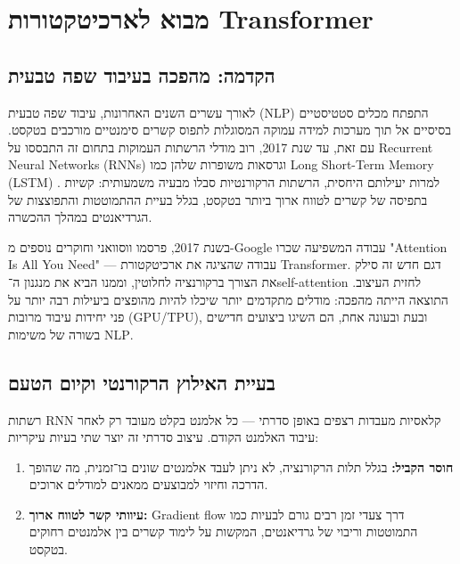 \chapter{מבוא לארכיטקטורות \textenglish{Transformer}}

\section{הקדמה: מהפכה בעיבוד שפה טבעית}

לאורך עשרים השנים האחרונות, עיבוד שפה טבעית (\textenglish{NLP}) התפתח מכלים סטטיסטיים בסיסיים אל תוך מערכות למידה עמוקה המסוגלות לתפוס קשרים סימנטיים מורכבים בטקסט. עם זאת, עד שנת 2017, רוב מודלי הרשתות העמוקות בתחום זה התבססו על \textenglish{Recurrent Neural Networks (RNNs)} וגרסאות משופרות שלהן כמו \textenglish{Long Short-Term Memory (LSTM)} \cite{vaswani2017attention}. למרות יעילותם היחסית, הרשתות הרקורנטיות סבלו מבעיה משמעותית: קשיות בתפיסה של קשרים לטווח ארוך ביותר בטקסט, בגלל בעיית ההתמוטטות והתפוצצות של הגרדיאנטים במהלך ההכשרה.

בשנת 2017, פרסמו ווסוואני וחוקרים נוספים מ-\textenglish{Google} עבודה המשפיעה שכרו \textenglish{"Attention Is All You Need"} --- עבודה שהציגה את ארכיטקטורת \textenglish{Transformer}. דגם חדש זה סילק את הצורך ברקורנציה לחלוטין, וממנו הביא את מנגנון ה־\textenglish{self-attention} לחזית העיצוב. התוצאה הייתה מהפכה: מודלים מתקדמים יותר שיכלו להיות מהופצים ביעילות רבה יותר על פני יחידות עיבוד מרובות (\textenglish{GPU/TPU}), ובעת ובעונה אחת, הם השיגו ביצועים חדישים בשורה של משימות \textenglish{NLP}.

\section{בעיית האילוץ הרקורנטי וקיום הטעם}

רשתות \textenglish{RNN} קלאסיות מעבדות רצפים באופן סדרתי --- כל אלמנט בקלט מעובד רק לאחר עיבוד האלמנט הקודם. עיצוב סדרתי זה יוצר שתי בעיות עיקריות:

\begin{enumerate}
\item \textbf{חוסר הקביל:} בגלל תלות הרקורנציה, לא ניתן לעבד אלמנטים שונים בו־זמנית, מה שהופך הדרכה וחיזוי למבוצעים ממאנים למודלים ארוכים.
\item \textbf{עיוותי קשר לטווח ארוך:} \textenglish{Gradient flow} דרך צעדי זמן רבים גורם לבעיות כמו התמוטטות וריבוי של גרדיאנטים, המקשות על לימוד קשרים בין אלמנטים רחוקים בטקסט.
\end{enumerate}

